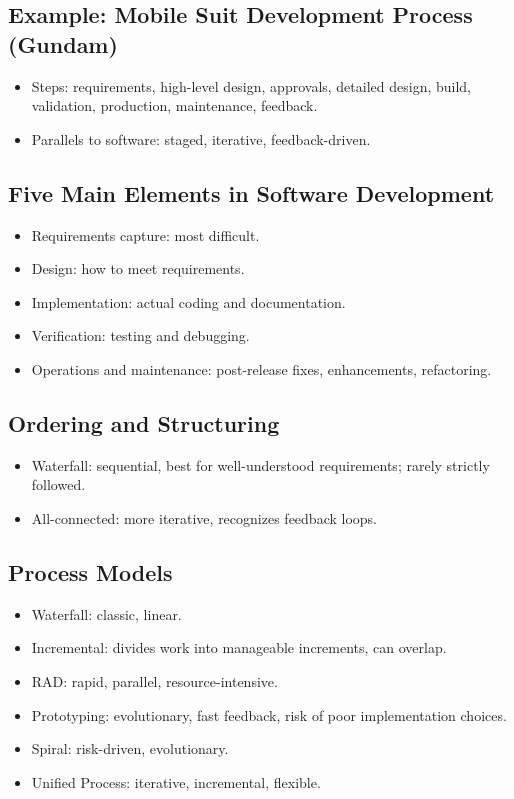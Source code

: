 \documentclass[11pt,a4paper]{article}
\begin{document}
\subsection*{Example: Mobile Suit Development Process (Gundam)}
\begin{itemize}
    \item Steps: requirements, high-level design, approvals, detailed design, build, validation, production, maintenance, feedback.
    \item Parallels to software: staged, iterative, feedback-driven.
\end{itemize}

\subsection*{Five Main Elements in Software Development}
\begin{itemize}
    \item Requirements capture: most difficult.
    \item Design: how to meet requirements.
    \item Implementation: actual coding and documentation.
    \item Verification: testing and debugging.
    \item Operations and maintenance: post-release fixes, enhancements, refactoring.
\end{itemize}

\subsection*{Ordering and Structuring}
\begin{itemize}
    \item Waterfall: sequential, best for well-understood requirements; rarely strictly followed.
    \item All-connected: more iterative, recognizes feedback loops.
\end{itemize}

\subsection*{Process Models}
\begin{itemize}
    \item Waterfall: classic, linear.
    \item Incremental: divides work into manageable increments, can overlap.
    \item RAD: rapid, parallel, resource-intensive.
    \item Prototyping: evolutionary, fast feedback, risk of poor implementation choices.
    \item Spiral: risk-driven, evolutionary.
    \item Unified Process: iterative, incremental, flexible.
\end{itemize}
\end{document}
